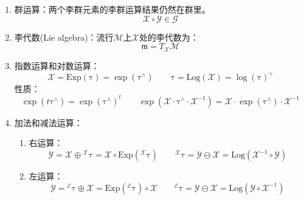 \documentclass[12pt, onecolumn]{article}
\newcommand\liehat[1]{#1^{\land}}
\newcommand\lievee[1]{#1^\vee}
\newcommand\Exp[1]{\mathrm{Exp}\left( #1\right) }
\newcommand\Log[1]{\mathrm{Log}\left( #1\right) }
\newcommand\bsm[1]{\boldsymbol{\mathrm{#1}}}
\begin{document}
	\begin{enumerate}
	\item 群运算：两个李群元素的李群运算结果仍然在群里。
	\begin{equation}
	\mathcal{X}\circ\mathcal{Y}\in\mathcal{G}
	\end{equation}
	
	\item 李代数(Lie algebra)：流行$\mathcal{M}$上$\mathcal{X}$处的李代数为：
	\begin{equation}
	\mathfrak{m}=T_{\mathcal{X}}\mathcal{M}
	\end{equation}
	
	\item 指数运算和对数运算：
	\begin{equation}
	\mathcal{X}=\mathrm{Exp}(\bsm\tau)=\exp(\liehat{\bsm\tau})
	\qquad
	\bsm\tau=\mathrm{Log}(\mathcal{X})=\lievee{\log({\bsm\tau})}
	\end{equation}
	性质：
	\begin{equation}
	\exp\left( t\liehat{\bsm{\tau}}\right) =\exp\left(\liehat{\bsm{\tau}}\right) ^{t}
	\qquad
	\exp\left( \mathcal{X}\cdot\liehat{\bsm{\tau}}\cdot\mathcal{X}^{-1}\right) =
	\mathcal{X}\cdot\exp\left( \liehat{\bsm{\tau}}\right)\cdot\mathcal{X}^{-1}
	\end{equation}
	
	\item 加法和减法运算：
	\begin{enumerate}
	\item 右运算：
	\begin{equation}
	\mathcal{Y}=\mathcal{X}\oplus{^\mathcal{X}\bsm\tau}
	=\mathcal{X}\circ\Exp{{^\mathcal{X}\bsm\tau}}
	\qquad
	{^\mathcal{X}\bsm\tau}=\mathcal{Y}\ominus\mathcal{X}
	=\Log{\mathcal{X}^{-1}\circ\mathcal{Y}} 
	\end{equation}
	
	\item 左运算：
	\begin{equation}
	\mathcal{Y}={^\mathcal{E}\bsm\tau}\oplus\mathcal{X}
	=\Exp{{^\mathcal{E}\bsm\tau}}\circ\mathcal{X}
	\qquad
	{^\mathcal{E}\bsm\tau}=\mathcal{Y}\ominus\mathcal{X}
	=\Log{\mathcal{Y}\circ\mathcal{X}^{-1}} 
	\end{equation}
	\end{enumerate}
	

\end{enumerate}
\end{document}
